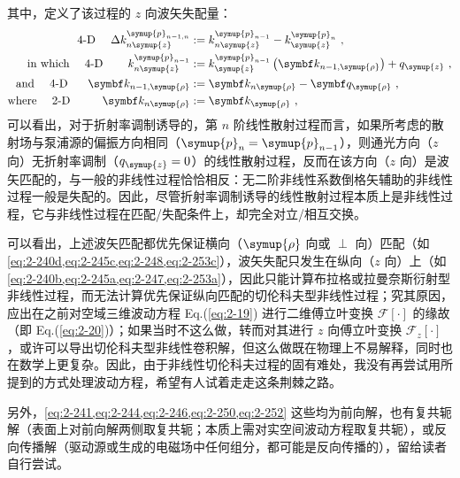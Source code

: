 其中，定义了该过程的 $z$ 向波矢失配量：
\begin{subequations} \label{eq:2-253}
	\abovedisplayskip=13pt
	\belowdisplayskip=13pt
	\begin{align}
		\text{4-D} \ \ \ \ \Delta k^{\symup{p}_{n-1,n}}_{n\symup{z}} &:= k^{\symup{p}_{n-1}}_{n\symup{z}} - k^{\symup{p}_{n}}_{\symup{z}} \label{eq:2-253a}~, \\ \text{in which}\ \ \ \ \text{4-D} \hspace{2.18em} k^{\symup{p}_{n-1}}_{n\symup{z}} &:= k^{\symup{p}_{n-1}}_{\symup{z}} \left( \symbf k_{n-1,\symup{\rho}} \right) + q_{\symup{z}} \label{eq:2-253b}~, \\ \text{and}\ \ \ \ \text{4-D} \hspace{1.75em} \symbf k_{n-1,\symup{\rho}} &:= \symbf k_{n\symup{\rho}} - \symbf q_{\symup{\rho}} \label{eq:2-253c}~, \\ \text{where}\ \ \ \ \text{2-D} \hspace{2.8em} \symbf k_{n\symup{\rho}} &:= \symbf k_{\symup{\rho}} \label{eq:2-253d}~,
	\end{align}
\end{subequations}
可以看出，对于折射率调制诱导的，第 $n$ 阶线性散射过程而言，如果所考虑的散射场与泵浦源的偏振方向相同（$\symup{p}_{n} = \symup{p}_{n-1}$），则通光方向（$z$ 向）无折射率调制（$q_{\symup{z}} = 0$）的线性散射过程，反而在该方向（$z$ 向）是波矢匹配的，与一般的非线性过程恰恰相反：无二阶非线性系数倒格矢辅助的非线性过程一般是失配的。因此，尽管折射率调制诱导的线性散射过程本质上是非线性过程，它与非线性过程在匹配/失配条件上，却完全对立/相互交换。

可以看出，上述波矢匹配都优先保证横向（$\symup{\rho}$ 向或 $\perp$ 向）匹配（如 \cref{eq:2-240d,eq:2-245c,eq:2-248,eq:2-253c}），波矢失配只发生在纵向（$z$ 向）上（如 \cref{eq:2-240b,eq:2-245a,eq:2-247,eq:2-253a}），因此只能计算布拉格或拉曼奈斯衍射型非线性过程，而无法计算优先保证纵向匹配的切伦科夫型非线性过程；究其原因，应出在之前对空域三维波动方程 Eq.(\ref{eq:2-19}) 进行二维傅立叶变换 $\mathcal F \left[ \cdot \right]$ 的缘故（即 Eq.(\ref{eq:2-20})）；如果当时不这么做，转而对其进行 $z$ 向傅立叶变换 $\mathcal F_z \left[ \cdot \right]$，或许可以导出切伦科夫型非线性卷积解，但这么做既在物理上不易解释，同时也在数学上更复杂。因此，由于非线性切伦科夫过程的固有难处，我没有再尝试用所提到的方式处理波动方程，希望有人试着走走这条荆棘之路。

另外，\cref{eq:2-241,eq:2-244,eq:2-246,eq:2-250,eq:2-252} 这些均为前向解，也有复共轭解（表面上对前向解两侧取复共轭；本质上需对实空间波动方程取复共轭），或反向传播解（驱动源或生成的电磁场中任何组分，都可能是反向传播的），留给读者自行尝试。

